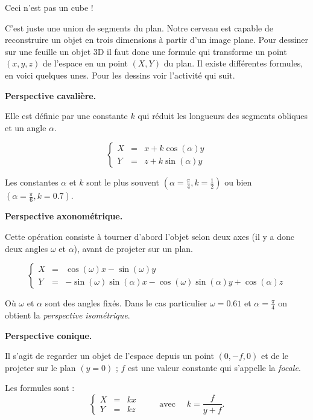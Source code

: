 \documentclass[11pt,class=report,crop=false]{standalone}
\begin{document}
\begin{cours}[Perspective]
	
Ceci n'est pas un cube !


C'est juste une union de segments du plan. Notre cerveau est capable de reconstruire un objet en trois dimensions à partir d'un image plane.
Pour dessiner sur une feuille un objet 3D il faut donc une formule qui transforme un point $(x,y,z)$ de l'espace en un point $(X,Y)$ du plan.
Il existe différentes formules, en voici quelques unes. Pour les dessins voir l'activité qui suit.

\bigskip
\textbf{Perspective cavalière.}

Elle est définie par une constante $k$ qui réduit les longueurs des segments obliques et un angle $\alpha$.

$$\left\{
\begin{array}{rcl}
X &=& x + k \cos(\alpha)y \\
Y &=& z + k \sin(\alpha)y
\end{array}
\right.$$



Les constantes $\alpha$ et $k$ sont le plus souvent  $(\alpha=\frac\pi4,k=\frac12)$ ou bien $(\alpha=\frac\pi6,k=0.7)$.
 
\bigskip

\textbf{Perspective axonométrique.}

Cette opération consiste à tourner d'abord l'objet selon deux axes (il y a donc deux angles $\omega$ et $\alpha$), avant de projeter sur un plan.

$$\left\{
\begin{array}{rcl}
X &=& \cos(\omega)x - \sin(\omega)y \\
Y &=& -\sin(\omega)\sin(\alpha)x - \cos(\omega)\sin(\alpha)y + \cos(\alpha)z
\end{array}
\right.$$ 

Où $\omega$ et $\alpha$ sont des angles fixés. Dans le cas particulier $\omega=0.61$ et $\alpha=\frac\pi4$
on obtient la \emph{perspective isométrique}.
 
\bigskip

\textbf{Perspective conique.} 

Il s'agit de regarder un objet de l'espace depuis un point $(0,-f,0)$ et de le projeter sur le plan $(y=0)$ ; $f$ est une valeur constante qui s'appelle la \emph{focale}.


Les formules sont :
$$\left\{
\begin{array}{rcl}
X &=& kx \\
Y &=& kz
\end{array}
\right.  \qquad \text{ avec } \quad k = \frac{f}{y+f}.$$ 
	
\end{cours}
\end{document}
